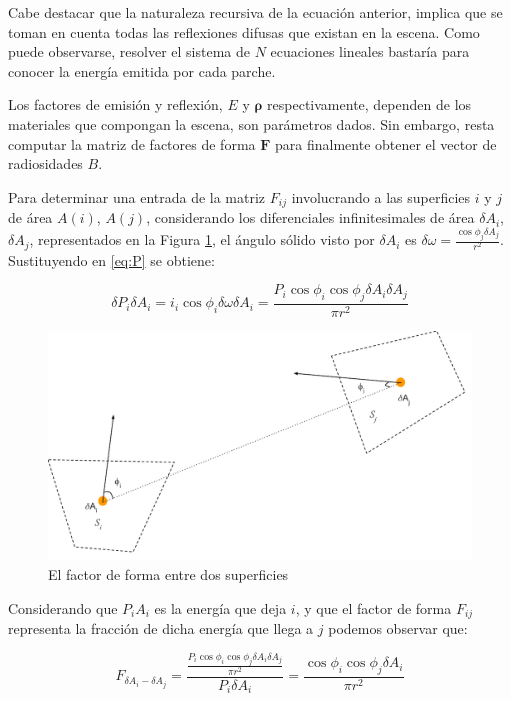 Cabe destacar que la naturaleza recursiva de la ecuación anterior, implica que se toman en cuenta todas las reflexiones difusas que existan en la escena. Como puede observarse, resolver el sistema de $N$ ecuaciones lineales bastaría para conocer la energía emitida por cada parche. 

Los factores de emisión y reflexión, $E$ y $\mathbf{\rho}$ respectivamente, dependen de los materiales que compongan la escena, son parámetros dados. Sin embargo, resta computar la matriz de factores de forma $\mathbf{F}$ para finalmente obtener el vector de radiosidades $B$. 

Para determinar una entrada de la matriz $F_{ij}$ involucrando a las superficies $i$ y $j$ de área $A(i)$, $A(j)$, considerando los diferenciales infinitesimales de área $\delta{A_{i}}$, $\delta{A_{j}}$, representados en la Figura \ref{img:ff2}, el ángulo sólido visto por $\delta{A_{i}}$ es $\delta{\omega} = \frac{\cos{\phi_{j}\delta{A_{j}}}}{r^{2}}$. Sustituyendo en \eqref{eq:P} se obtiene:

\begin{equation}
    \delta{P}_{i}\delta{A_{i}} = i_{i} \cos{\phi_{i}}\delta{\omega}\delta{A_{i}} = \frac{P_{i}\cos{\phi_{i}}\cos{\phi_{j}}\delta{A_{i}}\delta{A_{j}}}{\pi r^{2}}
\end{equation}

\vspace{5mm}
\begin{figure}[h]
	\centering
	\includegraphics[width=0.8\linewidth]{assets/ff}
	\caption{El factor de forma entre dos superficies}
	\label{img:ff2}
\end{figure}


Considerando que ${P}_{i}{A_{i}}$ es la energía que deja $i$, y que el factor de forma $F_{ij}$ representa la fracción de dicha energía que llega a $j$ podemos observar que:

\begin{equation}
    F_{\delta{A_{i}}-\delta{A_{j}}} = \frac{\frac{P_{i}\cos{\phi_{i}}\cos{\phi_{j}}\delta{A_{i}}\delta{A_{j}}}{\pi r^{2}}}{P_{i}\delta{A_{i}}} = \frac{\cos{\phi_{i}}\cos{\phi_{j}}\delta{A_{i}}}{\pi{r^{2}}}
\end{equation}

